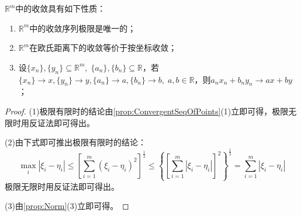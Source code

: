 \begin{property}\label{prop:RmConvergence}
	$\mathbb{R}^{m}$中的收敛具有如下性质：
	\begin{enumerate}
		\item $\mathbb{R}^{m}$中的收敛序列极限是唯一的；
		\item $\mathbb{R}^{m}$在欧氏距离下的收敛等价于按坐标收敛；
		\item 设$\{x_n\},\{y_n\}\subseteq\mathbb{R}^{m},\;\{a_n\},\{b_n\}\subseteq\mathbb{R}$，若$\{x_n\}\to x,\{y_n\}\to y,\{a_n\}\to a,\{b_n\}\to b,\;a,b\in\mathbb{R}$，则$a_nx_n+b_ny_n\to ax+by$；
	\end{enumerate}
\end{property}
\begin{proof}
	(1)极限有限时的结论由\cref{prop:ConvergentSeqOfPoints}(1)立即可得，极限无限时用反证法即可得出。\par
	(2)由下式即可推出极限有限时的结论：
	\begin{equation*}
		\max_i|\xi_i-\eta_i|\leqslant	\left[\sum_{i=1}^m(\xi_i-\eta_i)^2\right]^{\frac{1}{2}}\leqslant\left\{\left[\sum_{i=1}^{m}|\xi_i-\eta_i|\right]^2\right\}^{\frac{1}{2}}=\sum_{i=1}^{m}|\xi_i-\eta_i|
	\end{equation*}
	极限无限时用反证法即可得出。\par
	(3)由\cref{prop:Norm}(3)立即可得。
\end{proof}
